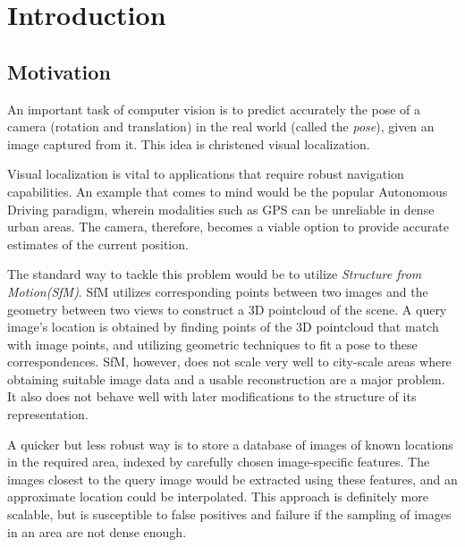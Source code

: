 

\chapter{Introduction}
\section{Motivation}
An important task of computer vision is to predict accurately the pose of a camera (rotation and translation) in the real world (called the \emph{pose}), given an image captured from it. This idea is christened visual localization. 

Visual localization is vital to applications that require robust navigation capabilities. An example that comes to mind would be the popular Autonomous Driving paradigm, wherein modalities such as GPS can be unreliable in dense urban areas. The camera, therefore, becomes a viable option to provide accurate estimates of the current position. 

The standard way to tackle this problem would be to utilize \emph{Structure from Motion(SfM)}. SfM utilizes corresponding points between two images and the geometry between two views to construct a 3D pointcloud of the scene. A query image's location is obtained by finding points of the 3D pointcloud that match with image points, and utilizing geometric techniques to fit a pose to these correspondences. SfM, however, does not scale very well to city-scale areas where obtaining suitable image data and a usable reconstruction are a major problem. It also does not behave well with later modifications to the structure of its representation.

A quicker but less robust way is to store a database of images of known locations in the required area, indexed by carefully chosen image-specific features. The images closest to the query image would be extracted using these features, and an approximate location could be interpolated. This approach is definitely more scalable, but is susceptible to false positives and failure if the sampling of images in an area are not dense enough. 


